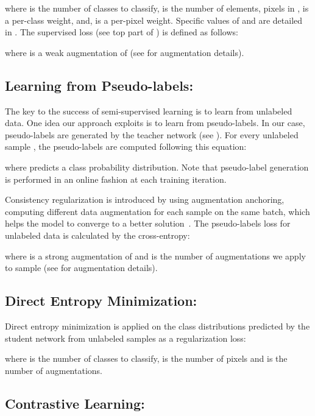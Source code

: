 \documentclass[10pt,twocolumn,letterpaper]{article}
\begin{document}
\noindent where  is the number of classes to classify,  is the number of elements, \ie pixels in ,  is a per-class weight, and,  is a per-pixel weight. Specific values of  and  are detailed in . The supervised loss (see top part of ) is defined as follows:


\noindent where  is a weak augmentation of  (see  for augmentation details). 

\subsection{Learning from Pseudo-labels: }
\label{sec:pseudolabels}

The key to the success of semi-supervised learning is to learn from unlabeled data. One idea our approach exploits is to learn from pseudo-labels.
In our case, pseudo-labels are generated by the teacher network  (see ). 
For every unlabeled sample , the pseudo-labels  are computed following this equation:
 
\noindent where  predicts a class probability distribution. 
Note that pseudo-label generation is performed in an online fashion at each training iteration.

Consistency regularization is introduced by using augmentation anchoring, \ie computing different data augmentation for each sample  on the same batch, which helps the model to converge to a better solution~\cite{sohn2020fixmatch}. 
The pseudo-labels loss for unlabeled data  is calculated by the cross-entropy:

where  is a strong augmentation of  and  is the number of augmentations we apply to sample  (see  for augmentation details). 

\subsection{Direct Entropy Minimization: }
\label{sec:entropy}
Direct entropy minimization is applied on the class distributions predicted by the student network from unlabeled samples  as a regularization loss: 

where  is the number of classes to classify,  is the number of pixels and  is the number of augmentations.

\subsection{Contrastive Learning: }
\label{sec:contrastive}
\end{document}
